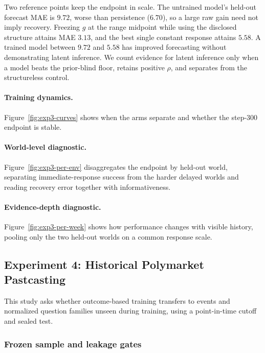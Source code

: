 Two reference points keep the endpoint in scale. The untrained model's held-out
forecast MAE is $9.72$, worse than persistence ($6.70$), so a large raw gain need
not imply recovery. Freezing $g$ at the range midpoint while using the disclosed
structure attains MAE $3.13$, and the best single constant response attains $5.58$.
A trained model between $9.72$ and $5.58$ has improved forecasting without
demonstrating latent inference. We count evidence for latent inference only when a
model beats the prior-blind floor, retains positive $\rho$, and separates from
the structureless control.

\paragraph{Training dynamics.}
Figure~\ref{fig:exp3-curves} shows when the arms separate and whether the
step-300 endpoint is stable.



\clearpage
\paragraph{World-level diagnostic.}
Figure~\ref{fig:exp3-per-env} disaggregates the endpoint by held-out world,
separating immediate-response success from the harder delayed worlds and reading
recovery error together with informativeness.



\clearpage
\paragraph{Evidence-depth diagnostic.}
Figure~\ref{fig:exp3-per-week} shows how performance changes with visible history,
pooling only the two held-out worlds on a common response scale.



\subsection{Experiment 4: Historical Polymarket Pastcasting}
\label{app:exp3b-protocol}

This study asks whether outcome-based training transfers to events and normalized
question families unseen during training, using a point-in-time cutoff and sealed
test.

\subsubsection{Frozen sample and leakage gates}

